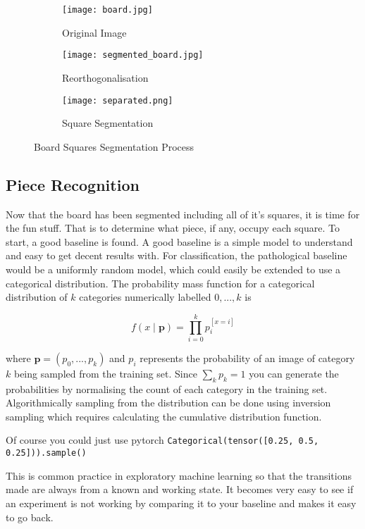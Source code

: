 \begin{figure}[h]
    \centering
    \begin{subfigure}[b]{0.32\textwidth}
        \centering
        \texttt{[image: board.jpg]}
        \caption{Original Image}
    \end{subfigure}
    \hfill
    \begin{subfigure}[b]{0.32\textwidth}
        \centering
        \texttt{[image: segmented\_board.jpg]}
        \caption{Reorthogonalisation}
    \end{subfigure}
    \hfill
    \begin{subfigure}[b]{0.32\textwidth}
        \centering
        \texttt{[image: separated.png]}
        \caption{Square Segmentation}
    \end{subfigure}
\caption{Board Squares Segmentation Process}
\label{fig:corner}
\end{figure}
    

\subsection{Piece Recognition}
Now that the board has been segmented including all of it's squares, it is time for the fun stuff.  That is
to determine what piece, if any, occupy each square.  To start, a good baseline is found.  
A good baseline is a simple model to understand and easy to get decent results with.
For classification, the pathological baseline would be a uniformly random model, which could easily be extended to use a categorical distribution.
The probability mass function for a categorical distribution of $k$ categories numerically labelled $0, ..., k$ is

$$ f(x \;|\; \bm{p}) = \prod\limits_{i=0}^{k}{p_i^{[x=i]}} $$

where $\bm{p} = (p_0, ..., p_k)$ and $p_i$ represents the probability of an image of category $k$ being sampled from the training set.
Since $\sum_{k}{p_k} = 1$ you can generate the probabilities by normalising the count of each category in the training set.  Algorithmically 
sampling from the distribution can be done using inversion sampling which requires calculating the cumulative distribution function.

Of course you could just use pytorch \verb|Categorical(tensor([0.25, 0.5, 0.25])).sample()| \cite{}

This is common practice in exploratory machine learning \cite{} so that the transitions
made are always from a known and working state.  It becomes very easy to see if an experiment is not working by comparing it to your baseline and 
makes it easy to go back.

